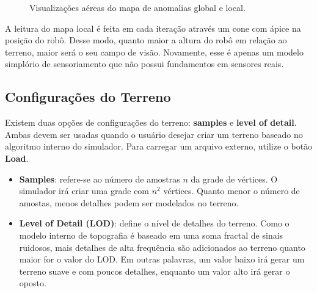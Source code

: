 \documentclass[11pt,a4paper]{article}
\begin{document}
\begin{figure}[htpb]
  \centering
  \caption{Visualizações aéreas do mapa de anomalias global e local.}
  \label{fig:anomalies}
\end{figure}

A leitura do mapa local é feita em cada iteração através um cone com
ápice na posição do robô. Desse modo, quanto maior a altura do robô em
relação ao terreno, maior será o seu campo de visão. Novamente, esse é
apenas um modelo simplório de sensoriamento que não possui fundamentos
em sensores reais.

\subsection{Configurações do Terreno}
\label{sec:terrain}

Existem duas opções de configurações do terreno: \textbf{samples} e
\textbf{level of detail}. Ambas devem ser usadas quando o usuário
desejar criar um terreno baseado no algoritmo interno do
simulador. Para carregar um arquivo externo, utilize o botão
\textbf{Load}.

\begin{itemize}
\item \textbf{Samples}: refere-se ao número de amostras $n$ da grade
  de vértices. O simulador irá criar uma grade com $n^2$
  vértices. Quanto menor o número de amostas, menos detalhes podem ser
  modelados no terreno.
\item \textbf{Level of Detail (LOD)}: define o nível de detalhes do
  terreno. Como o modelo interno de topografia é baseado em uma soma
  fractal de sinais ruidosos, mais detalhes de alta frequência são
  adicionados ao terreno quanto maior for o valor do LOD. Em outras
  palavras, um valor baixo irá gerar um terreno suave e com poucos
  detalhes, enquanto um valor alto irá gerar o oposto.
\end{itemize}
\end{document}

